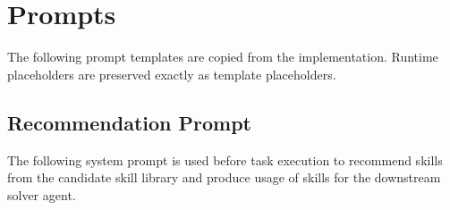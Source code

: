 \documentclass{llmxive}
\begin{document}
\section{Prompts}
\label{app:prompt}

The following prompt templates are copied from the implementation. Runtime placeholders are preserved exactly as template placeholders.

\subsection{Recommendation Prompt}


\noindent The following system prompt is used before task execution to recommend skills from the candidate skill library and produce usage of skills for the downstream solver agent.\par
\end{document}
